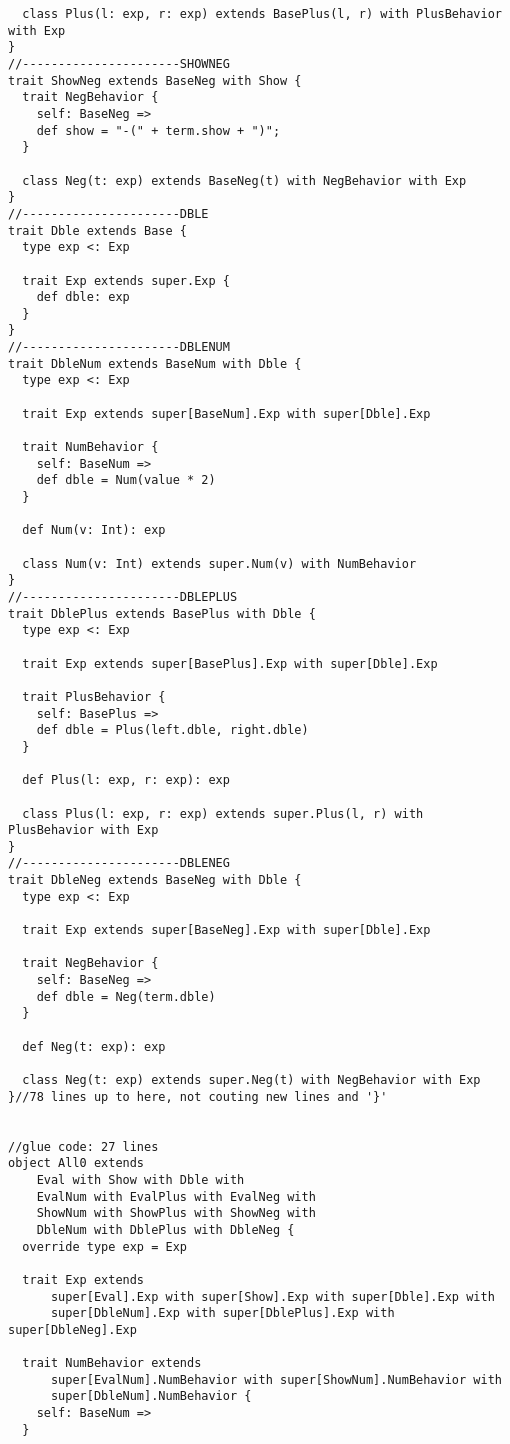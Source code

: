 \begin{lstlisting}
  class Plus(l: exp, r: exp) extends BasePlus(l, r) with PlusBehavior with Exp
}
//----------------------SHOWNEG
trait ShowNeg extends BaseNeg with Show {
  trait NegBehavior {
    self: BaseNeg =>
    def show = "-(" + term.show + ")";
  }

  class Neg(t: exp) extends BaseNeg(t) with NegBehavior with Exp
}
//----------------------DBLE
trait Dble extends Base {
  type exp <: Exp

  trait Exp extends super.Exp {
    def dble: exp
  }
}
//----------------------DBLENUM
trait DbleNum extends BaseNum with Dble {
  type exp <: Exp

  trait Exp extends super[BaseNum].Exp with super[Dble].Exp 
  
  trait NumBehavior {
    self: BaseNum =>
    def dble = Num(value * 2)
  }
  
  def Num(v: Int): exp

  class Num(v: Int) extends super.Num(v) with NumBehavior
}
//----------------------DBLEPLUS
trait DblePlus extends BasePlus with Dble {
  type exp <: Exp
  
  trait Exp extends super[BasePlus].Exp with super[Dble].Exp
  
  trait PlusBehavior {
    self: BasePlus =>
    def dble = Plus(left.dble, right.dble)
  }

  def Plus(l: exp, r: exp): exp
  
  class Plus(l: exp, r: exp) extends super.Plus(l, r) with PlusBehavior with Exp
}
//----------------------DBLENEG
trait DbleNeg extends BaseNeg with Dble {
  type exp <: Exp
  
  trait Exp extends super[BaseNeg].Exp with super[Dble].Exp

  trait NegBehavior {
    self: BaseNeg =>
    def dble = Neg(term.dble)
  }

  def Neg(t: exp): exp

  class Neg(t: exp) extends super.Neg(t) with NegBehavior with Exp
}//78 lines up to here, not couting new lines and '}'


//glue code: 27 lines
object All0 extends 
    Eval with Show with Dble with 
    EvalNum with EvalPlus with EvalNeg with 
    ShowNum with ShowPlus with ShowNeg with 
    DbleNum with DblePlus with DbleNeg {
  override type exp = Exp
  
  trait Exp extends 
      super[Eval].Exp with super[Show].Exp with super[Dble].Exp with
      super[DbleNum].Exp with super[DblePlus].Exp with super[DbleNeg].Exp 

  trait NumBehavior extends
      super[EvalNum].NumBehavior with super[ShowNum].NumBehavior with
      super[DbleNum].NumBehavior {
    self: BaseNum =>
  }


\end{lstlisting}
